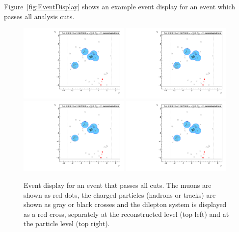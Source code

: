 Figure~\ref{fig:EventDisplay} shows an example event display for an event which passes all analysis cuts.

\begin{figure}[h!]
  \centering
  \includegraphics[page=26,width=0.48\textwidth]{figures/EventDisplays.pdf}
  \includegraphics[page=27,width=0.48\textwidth]{figures/EventDisplays.pdf} \\
  \includegraphics[page=29,width=0.48\textwidth]{figures/EventDisplays.pdf}
  \includegraphics[page=30,width=0.48\textwidth]{figures/EventDisplays.pdf}
  \caption{Event display for an event that passes all cuts. 
    The muons are shown as red dots, the charged particles (hadrons or tracks) are shown as gray or black crosses and the dilepton system is displayed as a red cross, separately at the reconstructed level (top left) and at the particle level (top right). 
}
\end{figure}
